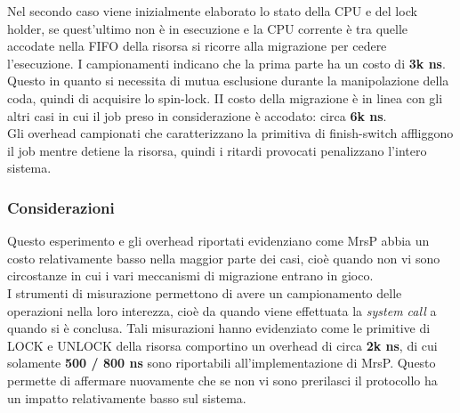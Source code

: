 \noindent Nel secondo caso viene inizialmente elaborato lo stato della CPU e del lock holder, se quest'ultimo non è in esecuzione e la CPU corrente è tra quelle accodate nella FIFO della risorsa si ricorre alla migrazione per cedere l'esecuzione. I campionamenti indicano che la prima parte ha un costo di \textbf{3k ns}. Questo in quanto si necessita di mutua esclusione durante la manipolazione della coda, quindi di acquisire lo spin-lock. II costo della migrazione è in linea con gli altri casi in cui il job preso in considerazione è accodato: circa \textbf{6k ns}.\\

\noindent Gli overhead campionati che caratterizzano la primitiva di finish-switch affliggono il job mentre detiene la risorsa, quindi i ritardi provocati penalizzano l'intero sistema.

\subsubsection{Considerazioni}
\label{sec:overhead_cons}

\noindent Questo esperimento e gli overhead riportati evidenziano come MrsP abbia un costo relativamente basso nella maggior parte dei casi, cioè quando non vi sono circostanze in cui i vari meccanismi di migrazione entrano in gioco.\\

\noindent I strumenti di misurazione permettono di avere un campionamento delle operazioni nella loro interezza, cioè da quando viene effettuata la \textit{system call} a quando si è conclusa. Tali misurazioni hanno evidenziato come le primitive di LOCK e UNLOCK della risorsa comportino un overhead di circa \textbf{2k ns}, di cui solamente \textbf{500 / 800 ns} sono riportabili all'implementazione di MrsP. Questo permette di affermare nuovamente che se non vi sono prerilasci il protocollo ha un impatto relativamente basso sul sistema.\\




